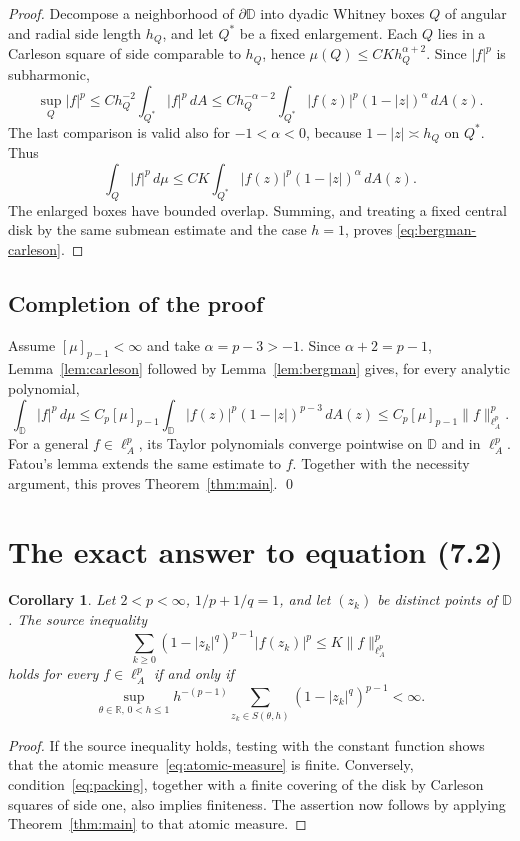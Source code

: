\documentclass[11pt]{article}
\newtheorem{corollary}[theorem]{Corollary}
\newcommand{\D}{\mathbb D}
\newcommand{\dd}{\,d}
\begin{document}
\begin{proof}
Decompose a neighborhood of $\partial\D$ into dyadic Whitney boxes $Q$ of
angular and radial side length $h_Q$, and let $Q^*$ be a fixed enlargement.
Each $Q$ lies in a Carleson square of side comparable to $h_Q$, hence
$\mu(Q)\leq CKh_Q^{\alpha+2}$.  Since $|f|^p$ is subharmonic,
\[
 \sup_Q|f|^p
 \leq Ch_Q^{-2}\int_{Q^*}|f|^p\dd A
 \leq Ch_Q^{-\alpha-2}
 \int_{Q^*}|f(z)|^p(1-|z|)^\alpha\dd A(z).
\]
The last comparison is valid also for $-1<\alpha<0$, because
$1-|z|\asymp h_Q$ on $Q^*$.  Thus
\[
 \int_Q|f|^p\dd\mu
 \leq CK\int_{Q^*}|f(z)|^p(1-|z|)^\alpha\dd A(z).
\]
The enlarged boxes have bounded overlap.  Summing, and treating a fixed
central disk by the same submean estimate and the case $h=1$, proves
\eqref{eq:bergman-carleson}.
\end{proof}

\subsection*{Completion of the proof}

Assume $[\mu]_{p-1}<\infty$ and take $\alpha=p-3>-1$.  Since
$\alpha+2=p-1$, Lemma~\ref{lem:carleson} followed by
Lemma~\ref{lem:bergman} gives, for every analytic polynomial,
\[
 \int_{\D}|f|^p\dd\mu
 \leq C_p[\mu]_{p-1}
 \int_{\D}|f(z)|^p(1-|z|)^{p-3}\dd A(z)
 \leq C_p[\mu]_{p-1}\|f\|_{\ell_A^p}^p.
\]
For a general $f\in\ell_A^p$, its Taylor polynomials converge pointwise on
$\D$ and in $\ell_A^p$.  Fatou's lemma extends the same estimate to $f$.
Together with the necessity argument, this proves
Theorem~\ref{thm:main}. \qed

\section{The exact answer to equation (7.2)}

\begin{corollary}\label{cor:atomic}
Let $2<p<\infty$, $1/p+1/q=1$, and let $(z_k)$ be distinct points of $\D$.
The source inequality
\[
 \sum_{k\geq0}(1-|z_k|^q)^{p-1}|f(z_k)|^p
 \leq K\|f\|_{\ell_A^p}^p
\]
holds for every $f\in\ell_A^p$ if and only if
\begin{equation}\label{eq:packing}
 \sup_{\theta\in\mathbb R,\,0<h\leq1}
 h^{-(p-1)}
 \sum_{z_k\in S(\theta,h)}(1-|z_k|^q)^{p-1}<\infty.
\end{equation}
\end{corollary}

\begin{proof}
If the source inequality holds, testing with the constant function shows that
the atomic measure~\eqref{eq:atomic-measure} is finite.  Conversely,
condition~\eqref{eq:packing}, together with a finite covering of the disk by
Carleson squares of side one, also implies finiteness.  The assertion now
follows by applying Theorem~\ref{thm:main} to that atomic measure.
\end{proof}
\end{document}
